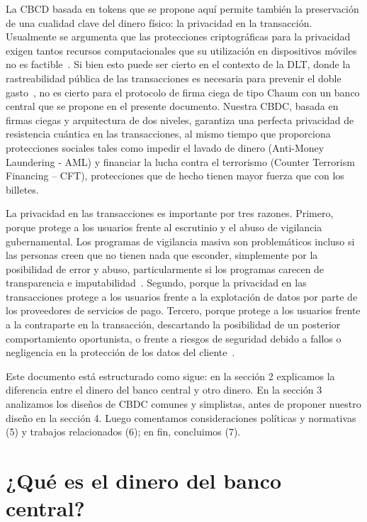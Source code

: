 \documentclass[10pt,spanish]{article}
\begin{document}
La CBCD basada en tokens que se propone aquí permite también la
preservación de una cualidad clave del dinero físico: la privacidad en
la transacción. Usualmente se argumenta que las protecciones
criptográficas para la privacidad exigen tantos recursos computacionales
que su utilización en dispositivos móviles no es factible~\cite[véase][]{Allen}.
Si bien esto puede ser cierto en el contexto de la DLT,
donde la rastreabilidad pública de las transacciones es necesaria para
prevenir el doble gasto~\cite{Narayanan}, no es cierto para el
protocolo de firma ciega de tipo Chaum con un banco central que se
propone en el presente documento. Nuestra CBDC, basada en firmas ciegas
y arquitectura de dos niveles, garantiza una perfecta privacidad de
resistencia cuántica en las transacciones, al mismo tiempo que
proporciona protecciones sociales tales como impedir el lavado de dinero
(Anti-Money Laundering - AML) y financiar la lucha contra el terrorismo
(Counter Terrorism Financing -- CFT), protecciones que de hecho tienen
mayor fuerza que con los billetes.

La privacidad en las transacciones es importante por tres razones.
Primero, porque protege a los usuarios frente al escrutinio y el abuso
de vigilancia gubernamental. Los programas de vigilancia masiva son
problemáticos incluso si las personas creen que no tienen nada que
esconder, simplemente por la posibilidad de error y abuso,
particularmente si los programas carecen de transparencia e
imputabilidad~\cite[véase][]{Solove}. Segundo, porque la privacidad en las
transacciones protege a los usuarios frente a la explotación de datos por parte
de los proveedores de servicios de pago.
Tercero, porque protege a los usuarios frente a la contraparte en la
transacción, descartando la posibilidad de un posterior comportamiento
oportunista, o frente a riesgos de seguridad debido a fallos o
negligencia en la protección de los datos del cliente~\cite[véase][]{Kahn2005}.

Este documento está estructurado como sigue: en la sección 2 explicamos
la diferencia entre el dinero del banco central y otro dinero. En la
sección 3 analizamos los diseños de CBDC comunes y simplistas, antes
de proponer nuestro diseño en la sección 4. Luego comentamos
consideraciones políticas y normativas (5) y trabajos relacionados (6);
en fin, concluimos (7).

\hypertarget{quuxe9-es-el-dinero-del-banco-central}{%
\section{¿Qué es el dinero del banco central?} \label{2.-quuxe9-es-el-dinero-del-banco-central}}
\end{document}
